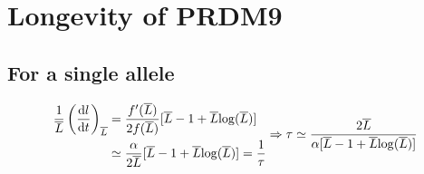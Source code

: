 \documentclass{article}
\begin{document}
\section{Longevity of PRDM9}
\subsection{For a single allele}

\begin{equation}
  \begin{aligned}
    \dfrac{1}{\overline{L}} \left( \dfrac{\mathrm{d}l}{\mathrm{d}t} \right)_{\overline{L}}
    &= \dfrac{f'(\overline{L})}{2 f(\overline{L})} [ \overline{L}-1 + \overline{L} \mathrm{log}(\overline{L})] \\
    &\simeq \dfrac{\alpha}{2 \overline{L}}[\overline{L}-1 + \overline{L} \mathrm{log}(\overline{L})] = \dfrac{1}{\tau} \\
  \end{aligned} \\
  \Rightarrow \tau \simeq \dfrac{2 \overline{L}}{\alpha[\overline{L}-1 + \overline{L} \mathrm{log}(\overline{L})]}
\end{equation}


\end{document}
